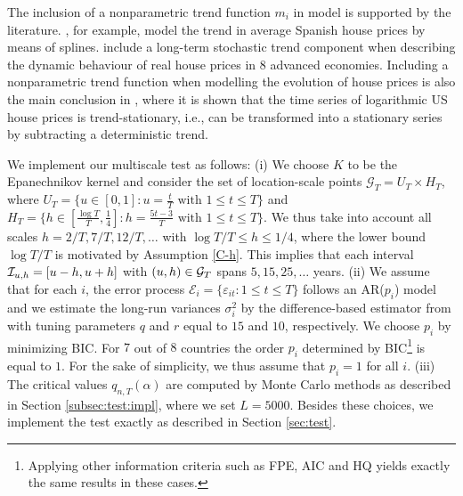 \documentclass[12pt]{article}
\makeatletter
\renewcommand{\eqref}[1]{\tagform@{\ref{#1}}}
\makeatother
\begin{document}
The inclusion of a nonparametric trend function $m_i$ in model \eqref{eq:model:app4} is supported by the literature. \cite{Ugarte2009}, for example, model the trend in average Spanish house prices by means of splines. \cite{Winter2022} include a long-term stochastic trend component when describing the dynamic behaviour of real house prices in $8$ advanced economies. Including a nonparametric trend function when modelling the evolution of house prices is also the main conclusion in \cite{Zhang2016}, where it is shown that the time series of logarithmic US house prices is trend-stationary, i.e., can be transformed into a stationary series by subtracting a deterministic trend.


We implement our multiscale test as follows: 
(i) We choose $K$ to be the Epanechnikov kernel and consider the set of location-scale points $\mathcal{G}_T = U_T \times H_T$, where $U_T = \{ u \in [0,1]: u = \textstyle{\frac{t}{T}} \text{ with } 1 \le t \le T \}$ and $H_T = \{ h \in [ \textstyle{\frac{\log T}{T}}, \textstyle{\frac{1}{4}} ]:  h = \textstyle{\frac{5t - 3}{T}} \text{ with } 1 \le t \le T \}$. We thus take into account
all scales $h=2/T, 7/T, 12/T,\ldots$ with $\log T /T \le h \le 1/4$, where the lower bound $\log T / T$ is motivated by Assumption \ref{C-h}. This implies that each interval $\mathcal{I}_{u, h} =[u-h,u+h]$ with $(u,h) \in \mathcal{G}_T$ spans $5, 15, 25, \ldots$ years.   
(ii) We assume that for each $i$, the error process $\mathcal{E}_i = \{\varepsilon_{it}: 1 \leq t \leq T\}$ follows an AR($p_i$) model and we estimate the long-run variances $\sigma_i^2$ by the difference-based estimator from \cite{KhismatullinaVogt2020} with tuning parameters $q$ and $r$ equal to $15$ and $10$, respectively. We choose $p_i$ by minimizing BIC. For $7$ out of $8$ countries the order $p_i$ determined by BIC\footnote{Applying other information criteria such as FPE, AIC and HQ yields exactly the same results in these cases.} is equal to $1$. For the sake of simplicity, we thus assume that $p_i = 1$ for all $i$.
(iii) The critical values $q_{n, T}(\alpha)$ are computed by Monte Carlo methods as described in Section \ref{subsec:test:impl}, where we set $L=5000$.
Besides these choices, we implement the test exactly as described in Section \ref{sec:test}.  
\end{document}
